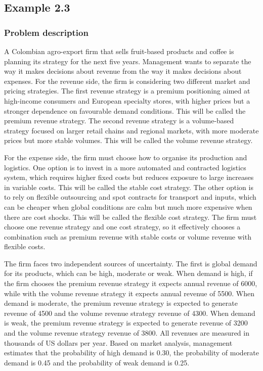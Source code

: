 \subsection{Example 2.3}\label{sec:example3}

\subsubsection{Problem description}\label{subsec:example3-problem}

A Colombian agro-export firm that sells fruit-based products and coffee is planning its strategy for the next five years.
Management wants to separate the way it makes decisions about revenue from the way it makes decisions about expenses. For
the revenue side, the firm is considering two different market and pricing strategies. The first revenue strategy is a
premium positioning aimed at high-income consumers and European specialty stores, with higher prices but a stronger
dependence on favourable demand conditions. This will be called the premium revenue strategy. The second revenue strategy
is a volume-based strategy focused on larger retail chains and regional markets, with more moderate prices but more stable
volumes. This will be called the volume revenue strategy.

\medskip
For the expense side, the firm must choose how to organise its production and logistics. One option is to invest in a more
automated and contracted logistics system, which requires higher fixed costs but reduces exposure to large increases in
variable costs. This will be called the stable cost strategy. The other option is to rely on flexible outsourcing and spot
contracts for transport and inputs, which can be cheaper when global conditions are calm but much more expensive when there
are cost shocks. This will be called the flexible cost strategy. The firm must choose one revenue strategy and one cost
strategy, so it effectively chooses a combination such as premium revenue with stable costs or volume revenue with
flexible costs.

\medskip
The firm faces two independent sources of uncertainty. The first is global demand for its products, which can be high,
moderate or weak. When demand is high, if the firm chooses the premium revenue strategy it expects annual revenue of 6000,
while with the volume revenue strategy it expects annual revenue of 5500. When demand is moderate, the premium revenue
strategy is expected to generate revenue of 4500 and the volume revenue strategy revenue of 4300. When demand is weak, the
premium revenue strategy is expected to generate revenue of 3200 and the volume revenue strategy revenue of 3800. All
revenues are measured in thousands of US dollars per year. Based on market analysis, management estimates that the
probability of high demand is 0.30, the probability of moderate demand is 0.45 and the probability of weak demand is 0.25.

